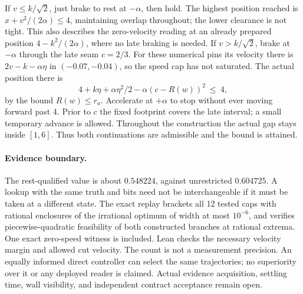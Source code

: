 \documentclass[11pt]{article}
\begin{document}
If \(v\le k/\sqrt 2\), just brake to rest at \(-\alpha\), then
hold. The highest position reached is
\(x+v^2/(2\alpha)\le4\), maintaining overlap throughout; the
lower clearance is not tight. This also describes the
zero-velocity reading at an already prepared position
\(4-k^2/(2\alpha)\), where no late braking is needed.
If \(v>k/\sqrt 2\), brake at \(-\alpha\) through the late seam
\(c=2/3\). For these numerical pins its velocity there is
\(2v-k-\alpha\eta\) in \((-0.07,-0.04)\), so the speed cap has not
saturated. The actual position there is
\[
 4+k\eta+\alpha\eta^2/2-\alpha(c-R(w))^2\ \le\ 4,
\]
by the bound \(R(w)\le r_a\). Accelerate at \(+\alpha\) to stop
without ever moving forward past 4. Prior to \(c\) the fixed footprint
covers the late interval; a small temporary advance is allowed.
Throughout the construction the actual gap stays inside \([1,6]\).
Thus both continuations are admissible and the bound is attained.

\paragraph{Evidence boundary.}
The rest-qualified value is about \(0.548224\), against unrestricted
\(0.604725\). A lookup with the same truth and bits need not be
interchangeable if it must be taken at a different state. The exact
replay brackets all 12 tested caps with rational enclosures of the
irrational optimum of width at most \(10^{-6}\), and verifies
piecewise-quadratic feasibility of both constructed branches
at rational extrema. One exact zero-speed witness is included.
Lean checks the necessary velocity margin and allowed cut velocity.
The count is not a measurement precision. An equally informed direct
controller can select the same trajectories; no superiority over it
or any deployed reader is claimed. Actual evidence acquisition,
settling time, wall visibility, and independent contract acceptance
remain open.
\end{document}
